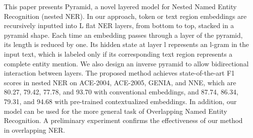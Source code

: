 This paper presents Pyramid, a novel layered model for Nested Named Entity Recognition (nested NER). In our approach, token or text region embeddings are recursively inputted into L flat NER layers, from bottom to top, stacked in a pyramid shape. Each time an embedding passes through a layer of the pyramid, its length is reduced by one. Its hidden state at layer l represents an l-gram in the input text, which is labeled only if its corresponding text region represents a complete entity mention. We also design an inverse pyramid to allow bidirectional interaction between layers. The proposed method achieves state-of-the-art F1 scores in nested NER on ACE-2004, ACE-2005, GENIA, and NNE, which are 80.27, 79.42, 77.78, and 93.70 with conventional embeddings, and 87.74, 86.34, 79.31, and 94.68 with pre-trained contextualized embeddings. In addition, our model can be used for the more general task of Overlapping Named Entity Recognition. A preliminary experiment confirms the effectiveness of our method in overlapping NER.
